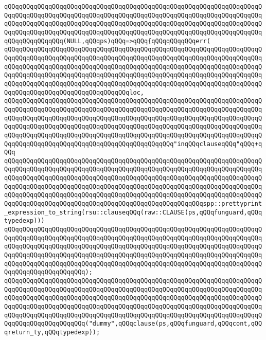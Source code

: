 \verb|qQQqqQQqqQQqqQQqqQQqqQQqqQQqqQQqqQQqqQQqqQQqqQQqqQQqqQQqqQQqqQQqqQQqqQQqqQQqqQQqqQQqqQQqqQQqqQQqqQQqqQQqqQQqqQQqqQQqqQQqqQQqqQQqqQQqqQQqqQQqqQQqqQQqqQQqqQQqqQQqqQQqqQQqqQQqqQQqqQQqqQQqqQQqqQQqqQQqqQQqqQQqqQQqqQQqqQQqqQQqqQQqqQQqqQQqqQQqqQQqqQQqqQQqqQQqqQQqqQQqqQQqqQQqqQQqqQQqqQQqqQQqqQQqqQQqqQQq(NULL,qQQqps)qQQq=>qQQq{qQQqqQQqqQQqerr(|\newline
\verb|qQQqqQQqqQQqqQQqqQQqqQQqqQQqqQQqqQQqqQQqqQQqqQQqqQQqqQQqqQQqqQQqqQQqqQQqqQQqqQQqqQQqqQQqqQQqqQQqqQQqqQQqqQQqqQQqqQQqqQQqqQQqqQQqqQQqqQQqqQQqqQQqqQQqqQQqqQQqqQQqqQQqqQQqqQQqqQQqqQQqqQQqqQQqqQQqqQQqqQQqqQQqqQQqqQQqqQQqqQQqqQQqqQQqqQQqqQQqqQQqqQQqqQQqqQQqqQQqqQQqqQQqqQQqqQQqqQQqqQQqqQQqqQQqqQQqqQQqqQQqqQQqqQQqqQQqqQQqqQQqqQQqqQQqqQQqqQQqqQQqqQQqqQQqqQQqqQQqqQQqqQQqqQQqqQQqqQQqqQQqqQQqloc,|\newline
\verb|qQQqqQQqqQQqqQQqqQQqqQQqqQQqqQQqqQQqqQQqqQQqqQQqqQQqqQQqqQQqqQQqqQQqqQQqqQQqqQQqqQQqqQQqqQQqqQQqqQQqqQQqqQQqqQQqqQQqqQQqqQQqqQQqqQQqqQQqqQQqqQQqqQQqqQQqqQQqqQQqqQQqqQQqqQQqqQQqqQQqqQQqqQQqqQQqqQQqqQQqqQQqqQQqqQQqqQQqqQQqqQQqqQQqqQQqqQQqqQQqqQQqqQQqqQQqqQQqqQQqqQQqqQQqqQQqqQQqqQQqqQQqqQQqqQQqqQQqqQQqqQQqqQQqqQQqqQQqqQQqqQQqqQQqqQQqqQQqqQQqqQQqqQQqqQQqqQQqqQQqqQQqqQQqqQQqqQQqqQQqqQQqqQQqqQQqqQQq"inqQQqclauseqQQq"qQQq+qQQq|\newline
\verb|qQQqqQQqqQQqqQQqqQQqqQQqqQQqqQQqqQQqqQQqqQQqqQQqqQQqqQQqqQQqqQQqqQQqqQQqqQQqqQQqqQQqqQQqqQQqqQQqqQQqqQQqqQQqqQQqqQQqqQQqqQQqqQQqqQQqqQQqqQQqqQQqqQQqqQQqqQQqqQQqqQQqqQQqqQQqqQQqqQQqqQQqqQQqqQQqqQQqqQQqqQQqqQQqqQQqqQQqqQQqqQQqqQQqqQQqqQQqqQQqqQQqqQQqqQQqqQQqqQQqqQQqqQQqqQQqqQQqqQQqqQQqqQQqqQQqqQQqqQQqqQQqqQQqqQQqqQQqqQQqqQQqqQQqqQQqqQQqqQQqqQQqqQQqqQQqqQQqqQQqqQQqqQQqqQQqqQQqqQQqqQQqqQQqqQQqqQQqqQQqqQQqspp::prettyprint_expression_to_string(rsu::clauseqQQq(raw::CLAUSE(ps,qQQqfunguard,qQQqtypedexp)))|\newline
\verb|qQQqqQQqqQQqqQQqqQQqqQQqqQQqqQQqqQQqqQQqqQQqqQQqqQQqqQQqqQQqqQQqqQQqqQQqqQQqqQQqqQQqqQQqqQQqqQQqqQQqqQQqqQQqqQQqqQQqqQQqqQQqqQQqqQQqqQQqqQQqqQQqqQQqqQQqqQQqqQQqqQQqqQQqqQQqqQQqqQQqqQQqqQQqqQQqqQQqqQQqqQQqqQQqqQQqqQQqqQQqqQQqqQQqqQQqqQQqqQQqqQQqqQQqqQQqqQQqqQQqqQQqqQQqqQQqqQQqqQQqqQQqqQQqqQQqqQQqqQQqqQQqqQQqqQQqqQQqqQQqqQQqqQQqqQQqqQQqqQQqqQQqqQQqqQQqqQQqqQQqqQQqqQQqqQQq);|\newline
\newline
\verb|qQQqqQQqqQQqqQQqqQQqqQQqqQQqqQQqqQQqqQQqqQQqqQQqqQQqqQQqqQQqqQQqqQQqqQQqqQQqqQQqqQQqqQQqqQQqqQQqqQQqqQQqqQQqqQQqqQQqqQQqqQQqqQQqqQQqqQQqqQQqqQQqqQQqqQQqqQQqqQQqqQQqqQQqqQQqqQQqqQQqqQQqqQQqqQQqqQQqqQQqqQQqqQQqqQQqqQQqqQQqqQQqqQQqqQQqqQQqqQQqqQQqqQQqqQQqqQQqqQQqqQQqqQQqqQQqqQQqqQQqqQQqqQQqqQQqqQQqqQQqqQQqqQQqqQQqqQQqqQQqqQQqqQQqqQQqqQQqqQQqqQQqqQQqqQQqqQQqqQQqqQQqqQQqqQQq("dummy",qQQqclause(ps,qQQqfunguard,qQQqcont,qQQqreturn_ty,qQQqtypedexp));|\newline
